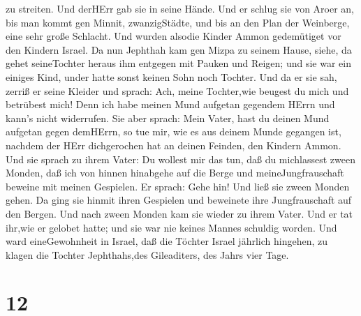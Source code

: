 zu streiten. Und derHErr gab sie in seine Hände.  Und er
schlug sie von Aroer an, bis man kommt gen Minnit, zwanzigStädte, und
bis an den Plan der Weinberge, eine sehr große Schlacht. Und wurden
alsodie Kinder Ammon gedemütiget vor den Kindern Israel. 
Da nun Jephthah kam gen Mizpa zu seinem Hause, siehe, da gehet
seineTochter heraus ihm entgegen mit Pauken und Reigen; und sie war ein
einiges Kind, under hatte sonst keinen Sohn noch Tochter. 
Und da er sie sah, zerriß er seine Kleider und sprach: Ach, meine
Tochter,wie beugest du mich und betrübest mich! Denn ich habe meinen
Mund aufgetan gegendem HErrn und kann's nicht widerrufen. 
Sie aber sprach: Mein Vater, hast du deinen Mund aufgetan gegen
demHErrn, so tue mir, wie es aus deinem Munde gegangen ist, nachdem der
HErr dichgerochen hat an deinen Feinden, den Kindern Ammon.
 Und sie sprach zu ihrem Vater: Du wollest mir das tun, daß
du michlassest zween Monden, daß ich von hinnen hinabgehe auf die Berge
und meineJungfrauschaft beweine mit meinen Gespielen.  Er
sprach: Gehe hin! Und ließ sie zween Monden gehen. Da ging sie hinmit
ihren Gespielen und beweinete ihre Jungfrauschaft auf den Bergen.
 Und nach zween Monden kam sie wieder zu ihrem Vater. Und
er tat ihr,wie er gelobet hatte; und sie war nie keines Mannes schuldig
worden. Und ward eineGewohnheit in Israel,  daß die Töchter
Israel jährlich hingehen, zu klagen die Tochter Jephthahs,des
Gileaditers, des Jahrs vier Tage.

\hypertarget{section-11}{%
\section{12}\label{section-11}}

